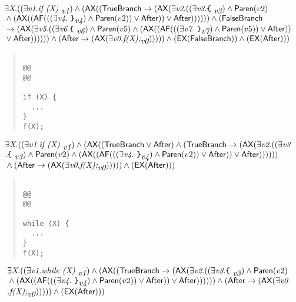 \documentclass{article}
\newcommand{\AX}{\mbox{\sf{AX}}}
\newcommand{\EX}{\mbox{\sf{EX}}}
\newcommand{\AF}{\mbox{\sf{AF}}}
\newcommand{\mita}[1]{\mbox{\it{{#1}}}}
\newcommand{\msf}[1]{\mbox{\sf{{#1}}}}
\newcommand{\ttlb}{\mbox{\tt \char'173}}
\newcommand{\ttrb}{\mbox{\tt \char'175}}
\begin{document}
\[\begin{array}{l}
\exists \mita{X} . ((\exists \mita{v1} . \mita{if (X) }_{\mita{v1}}) \wedge (\AX((\msf{TrueBranch} \rightarrow (\AX(\exists \mita{v2} . ((\exists \mita{v3} . \mita{{\ttlb}
  }_{\mita{v3}}) \wedge \msf{Paren}(v2)\\\mbox{} \wedge (\AX((\AF(((\exists \mita{v4} . \mita{
{\ttrb}}_{\mita{v4}}) \wedge \msf{Paren}(v2)) \vee \msf{After})) \vee \msf{After})))))) \wedge (\msf{FalseBranch}\\\mbox{} \rightarrow (\AX(\exists \mita{v5} . ((\exists \mita{v6} . \mita{{\ttlb}
  }_{\mita{v6}}) \wedge \msf{Paren}(v5) \wedge (\AX((\AF(((\exists \mita{v7} . \mita{
{\ttrb}}_{\mita{v7}}) \wedge \msf{Paren}(v5)) \vee \msf{After}))\\\mbox{} \vee \msf{After})))))) \wedge (\msf{After} \rightarrow (\AX(\exists \mita{v0} . \mita{f(X);}_{\mita{v0}}))))) \wedge (\EX(\msf{FalseBranch})) \wedge (\EX(\msf{After})))
\end{array}\]

\begin{quote}\begin{verbatim}

@@
@@

if (X) {
  ...
}
f(X);
\end{verbatim}\end{quote}

\[\begin{array}{l}
\exists \mita{X} . ((\exists \mita{v1} . \mita{if (X) }_{\mita{v1}}) \wedge (\AX((\msf{TrueBranch} \vee \msf{After}) \wedge (\msf{TrueBranch} \rightarrow (\AX(\exists \mita{v2} . ((\exists \mita{v3}\\\mbox{} . \mita{{\ttlb}
  }_{\mita{v3}}) \wedge \msf{Paren}(v2) \wedge (\AX((\AF(((\exists \mita{v4} . \mita{
{\ttrb}}_{\mita{v4}}) \wedge \msf{Paren}(v2)) \vee \msf{After})) \vee \msf{After}))))))\\\mbox{} \wedge (\msf{After} \rightarrow (\AX(\exists \mita{v0} . \mita{f(X);}_{\mita{v0}}))))) \wedge (\EX(\msf{After})))
\end{array}\]

\begin{quote}\begin{verbatim}

@@
@@

while (X) {
  ...
}
f(X);
\end{verbatim}\end{quote}

\[\begin{array}{l}
\exists \mita{X} . ((\exists \mita{v1} . \mita{while (X) }_{\mita{v1}}) \wedge (\AX((\msf{TrueBranch} \rightarrow (\AX(\exists \mita{v2} . ((\exists \mita{v3} . \mita{{\ttlb}
  }_{\mita{v3}}) \wedge \msf{Paren}(v2)\\\mbox{} \wedge (\AX((\AF(((\exists \mita{v4} . \mita{
{\ttrb}}_{\mita{v4}}) \wedge \msf{Paren}(v2)) \vee \msf{After})) \vee \msf{After})))))) \wedge (\msf{After} \rightarrow (\AX(\exists \mita{v0}\\\mbox{} . \mita{f(X);}_{\mita{v0}}))))) \wedge (\EX(\msf{After})))
\end{array}\]
\end{document}
